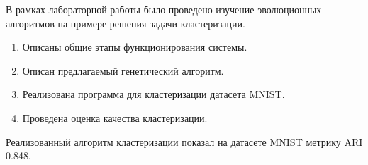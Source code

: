 
В рамках лабораторной работы было проведено изучение эволюционных алгоритмов на примере решения задачи кластеризации.

\begin{enumerate}[label*=\arabic*.]
	\item Описаны общие этапы функционирования системы.
	\item  Описан предлагаемый генетический алгоритм.
	\item  Реализована программа для кластеризации датасета MNIST.
	\item  Проведена оценка качества кластеризации.
\end{enumerate}

Реализованный алгоритм кластеризации показал на датасете MNIST метрику ARI 0.848.

